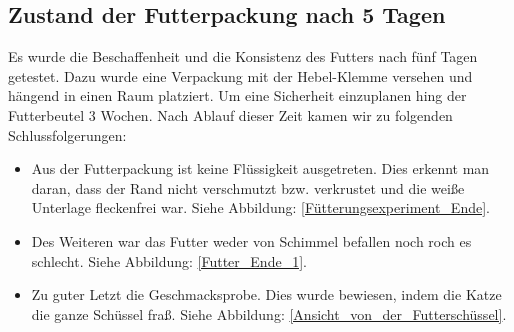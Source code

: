 \subsection{Zustand der Futterpackung nach 5 Tagen}

Es wurde die Beschaffenheit und die Konsistenz des Futters nach fünf Tagen getestet. Dazu wurde eine Verpackung mit der Hebel-Klemme versehen und hängend in einen Raum platziert. Um eine Sicherheit einzuplanen hing der Futterbeutel 3 Wochen. Nach Ablauf dieser Zeit kamen wir zu folgenden Schlussfolgerungen: 

\begin{itemize}
\item Aus der Futterpackung ist keine Flüssigkeit ausgetreten. Dies erkennt man daran, dass der Rand nicht verschmutzt bzw. verkrustet  und die weiße Unterlage fleckenfrei war. Siehe Abbildung: \ref{Fütterungsexperiment_Ende}.
\item Des Weiteren war das Futter weder von Schimmel befallen noch roch es schlecht. Siehe Abbildung: \ref{Futter_Ende_1}.
\item Zu guter Letzt die Geschmacksprobe. Dies wurde bewiesen, indem die Katze die ganze Schüssel fraß. Siehe Abbildung: \ref{Ansicht_von_der_Futterschüssel}.

\end{itemize} 

